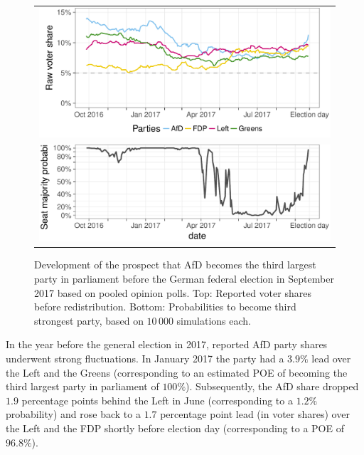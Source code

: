 \documentclass[smallcondensed]{svjour3}     %
\begin{document}
\begin{figure}[H]\centering
\begin{tabular}{l}
\includegraphics[height=.2\textwidth]{figures/2017_pooled_afd_rawShares.pdf}
\\
\includegraphics[height=.15\textwidth]{figures/2017_pooled_afd_thirdPartyProb.pdf}
\end{tabular}
\caption{Development of the prospect that AfD becomes the third largest party
in parliament before the German federal election in September 2017 based on pooled
opinion polls.
Top: Reported voter shares before redistribution.
Bottom: Probabilities to become third strongest party, based on $10\,000$ simulations each.
\label{fig:2017_afd}
}
\end{figure}

In the year before the general election in 2017, reported AfD party shares
underwent strong fluctuations. In January 2017 the party had a $3.9\%$ lead
over the Left and the Greens (corresponding to an estimated POE of
becoming the third largest party in parliament of $100\%$). Subsequently, the
AfD share dropped $1.9$ percentage points behind the Left in June
(corresponding to a $1.2\%$ probability)
and rose back to a $1.7$ percentage point lead (in voter shares) over the Left
and the FDP shortly before election day (corresponding to a POE of $96.8\%$).
\end{document}

